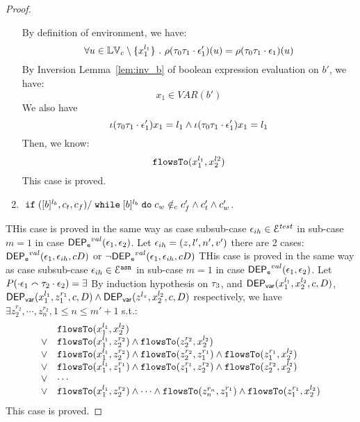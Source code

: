 \begin{proof}
\begin{enumerate}
 By definition of environment, we have:
\[
  \forall u \in \mathbb{LV}_c \setminus \{x_1^{l_1}\} ~.~
  \rho(\mathtt{\tau}_0 \mathtt{\tau}_1 \cdot \mathtt{\epsilon}_1') (u) =  
  \rho(\mathtt{\tau}_0 \mathtt{\tau}_1 \cdot \mathtt{\epsilon}_1) (u)
\]
%
By {Inversion Lemma~\ref{lem:inv_b}} of boolean expression evaluation on $b'$, we have:
 \[
  x_1 \in VAR(b')
 \]
 We also have 
 $$
 \iota(\mathtt{\tau}_0 \mathtt{\tau}_1 \cdot \mathtt{\epsilon}_1') x_1 = l_1
 \land 
 \iota(\mathtt{\tau}_0 \mathtt{\tau}_1 \cdot \mathtt{\epsilon}_1') x_1 = l_1
 $$
 Then, we know:
 \[
 \mathtt{flowsTo}(x_1^{l_1}, x_2^{l2})
 \]
 This case is proved.
\item $\;\mathtt{if}\;([b]{}^{l_b}, c_t, c_f) / \;\mathtt{while}\; [b]{}^{l_b} \;\mathtt{do}\; c_w \notin_c c_f' \land c_t' \land c_w'$.

\end{enumerate}
%
THis case is proved in the same way as case subsub-case $\mathtt{\epsilon}_{ih} \in \mathcal{E}^{test}$ in sub-case $m = 1$ in case $\mathsf{DEP_{\mathtt{e}}}^{val}(\mathtt{\epsilon}_1, \mathtt{\epsilon}_2)$.
%
Let $\mathtt{\epsilon}_{ih} = (z, l', n', v')$  there are 2 cases:
$\mathsf{DEP_{\mathtt{e}}}^{val}(\mathtt{\epsilon}_1, \mathtt{\epsilon}_{ih}, c D)$ or $\neg \mathsf{DEP_{\mathtt{e}}}^{val}(\mathtt{\epsilon}_1, \mathtt{\epsilon}_{ih}, c D)$
%
%
THis case is proved in the same way as case subsub-case $\mathtt{\epsilon}_{ih} \in \mathcal{E}^{\mathtt{{asn}}}$ in sub-case $m = 1$ in case $\mathsf{DEP_{\mathtt{e}}}^{val}(\mathtt{\epsilon}_1, \mathtt{\epsilon}_2)$.
%
Let $P(\cdot \mathtt{\epsilon}_1 \smallfrown \mathtt{\tau}_2 \cdot \mathtt{\epsilon}_2) = \exists$
By induction hypothesis on $\mathtt{\tau}_3$,
 and $\mathsf{DEP_{var}}(x_1^{l_1}, x_2^{l_2}, c, D)$, 
$\mathsf{DEP_{var}}(x_1^{l_1}, z_1^{r_1}, c, D) \land \mathsf{DEP_{var}}(z^{l_z}, x_2^{l_2}, c, D)$ respectively, 
we have $\exists z_2^{r_2}, \cdots, z_n^{r_2}, 1 \leq n \leq m'+1$ s.t.:
\[
\begin{array}{ll}
      & \mathtt{flowsTo}(x_1^{l_1}, x_2^{l_2}) \\
  \lor  & \mathtt{flowsTo}(x_1^{l_1}, z_2^{r_2}) \land \mathtt{flowsTo}(z_2^{r_2}, x_2^{l_2})\\
  \lor  & \mathtt{flowsTo}(x_1^{l_1}, z_2^{r_2}) \land \mathtt{flowsTo}(z_2^{r_2}, z_1^{r_1}) \land \mathtt{flowsTo}(z_1^{r_1}, x_2^{l_2}) \\
  \lor  & \mathtt{flowsTo}(x_1^{l_1}, z_1^{r_1}) \land \mathtt{flowsTo}(z_1^{r_1}, z_2^{r_2}) \land \mathtt{flowsTo}(z_2^{r_2}, x_2^{l_2}) \\
  \lor  & \cdots \\
  \lor  & \mathtt{flowsTo}(x_1^{l_1}, z_2^{r_2}) \land \cdots \land \mathtt{flowsTo}(z_n^{r_n}, z_1^{r_1}) \land \mathtt{flowsTo}(z_1^{r_1}, x_2^{l_2}) \\
\end{array}
\]
This case is proved.
\end{proof}